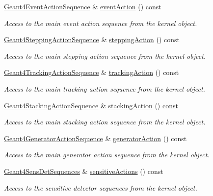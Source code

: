 \begin{DoxyCompactItemize}
\hyperlink{class_d_d4hep_1_1_simulation_1_1_geant4_event_action_sequence}{Geant4\+Event\+Action\+Sequence} \& \hyperlink{class_d_d4hep_1_1_simulation_1_1_geant4_context_a49bd243808a839dd79651786db634a9f}{event\+Action} () const
\begin{DoxyCompactList}\small\item\em Access to the main event action sequence from the kernel object. \end{DoxyCompactList}\item 
\hyperlink{class_d_d4hep_1_1_simulation_1_1_geant4_stepping_action_sequence}{Geant4\+Stepping\+Action\+Sequence} \& \hyperlink{class_d_d4hep_1_1_simulation_1_1_geant4_context_ad33f2c819cb0b1fee1fd30c1e784b42c}{stepping\+Action} () const
\begin{DoxyCompactList}\small\item\em Access to the main stepping action sequence from the kernel object. \end{DoxyCompactList}\item 
\hyperlink{class_d_d4hep_1_1_simulation_1_1_geant4_tracking_action_sequence}{Geant4\+Tracking\+Action\+Sequence} \& \hyperlink{class_d_d4hep_1_1_simulation_1_1_geant4_context_a86eb704863a06c584df3d6d4770b7212}{tracking\+Action} () const
\begin{DoxyCompactList}\small\item\em Access to the main tracking action sequence from the kernel object. \end{DoxyCompactList}\item 
\hyperlink{class_d_d4hep_1_1_simulation_1_1_geant4_stacking_action_sequence}{Geant4\+Stacking\+Action\+Sequence} \& \hyperlink{class_d_d4hep_1_1_simulation_1_1_geant4_context_a00a85304b9e0f665406a051d08ec07e9}{stacking\+Action} () const
\begin{DoxyCompactList}\small\item\em Access to the main stacking action sequence from the kernel object. \end{DoxyCompactList}\item 
\hyperlink{class_d_d4hep_1_1_simulation_1_1_geant4_generator_action_sequence}{Geant4\+Generator\+Action\+Sequence} \& \hyperlink{class_d_d4hep_1_1_simulation_1_1_geant4_context_a4c447bc986781e63d5942600fcd76ef2}{generator\+Action} () const
\begin{DoxyCompactList}\small\item\em Access to the main generator action sequence from the kernel object. \end{DoxyCompactList}\item 
\hyperlink{class_d_d4hep_1_1_simulation_1_1_geant4_sens_det_sequences}{Geant4\+Sens\+Det\+Sequences} \& \hyperlink{class_d_d4hep_1_1_simulation_1_1_geant4_context_a6dc64861f400429806fd23845b9e6f97}{sensitive\+Actions} () const
\begin{DoxyCompactList}\small\item\em Access to the sensitive detector sequences from the kernel object. \end{DoxyCompactList}\end{DoxyCompactItemize}
